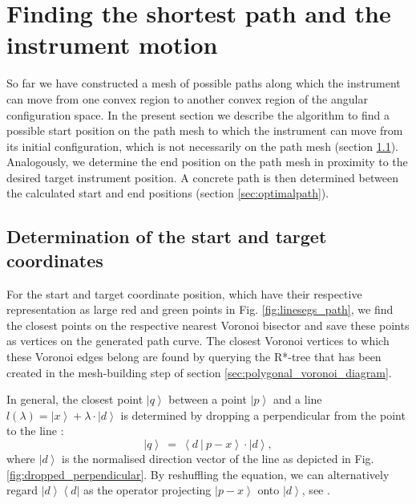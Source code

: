 




\section{Finding the shortest path and the instrument motion}
\label{sec:exepath}

So far we have constructed a mesh of possible paths along which the instrument can move
from one convex region to another convex region of the angular configuration space.
In the present section we describe the algorithm to find a possible start position on the
path mesh to which the instrument can move from its initial configuration, which is
not necessarily on the path mesh (section \ref{sec:startend}).
Analogously, we determine the end position on the path mesh in proximity to the 
desired target instrument position.
A concrete path is then determined between the calculated start and end positions
(section \ref{sec:optimalpath}).


\subsection{Determination of the start and target coordinates}
\label{sec:startend}

For the start and target coordinate position, which have their respective 
representation as large red and green points in Fig. \ref{fig:linesegs_path}, 
we find the closest points on the respective nearest Voronoi bisector and save 
these points as vertices on the generated path curve.
The closest Voronoi vertices to which these Voronoi edges belong are found by 
querying the R*-tree that has been created in the mesh-building step of section
\ref{sec:polygonal_voronoi_diagram}.

In general, the closest point $\left|q\right>$ between a point $\left|p\right>$ 
and a line $l\left(\lambda\right) = \left|x\right> + \lambda \cdot \left|d\right>$ 
is determined by dropping a perpendicular from the point to the line \cite{wiki_proj}:
\begin{equation}
	\left|q\right> \ =\  \left<d  \ |\  p - x \right> \cdot \left|d\right>,
\end{equation}
where $\left|d\right>$ is the normalised direction vector of the line as depicted 
in Fig. \ref{fig:dropped_perpendicular}.
By reshuffling the equation, we can alternatively regard $\left|d\right> \left<d\right|$
as the operator projecting $\left| p - x \right>$ onto $\left|d\right>$, see \cite[p. 814]{Arens2015}.

